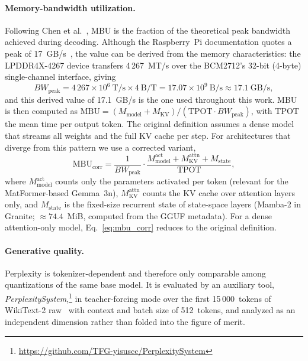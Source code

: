 \documentclass[acmsmall,natbib=false]{acmart}
\begin{document}
\paragraph{Memory-bandwidth utilization.}
Following Chen et al.~\cite{chen_inference_2025}, MBU is the fraction of the
theoretical peak bandwidth achieved during decoding. Although the
Raspberry~Pi documentation quotes a peak of
17~GB/s~\cite{BCM2712Doc}, the value can be derived from the memory
characteristics: the LPDDR4X-4267 device transfers 4\,267~MT/s over the
BCM2712's 32-bit (4-byte) single-channel interface, giving
\begin{equation}
  BW_{\mathrm{peak}} = 4\,267\times10^{6}~\mathrm{T/s} \times 4~\mathrm{B/T}
  = 17.07\times10^{9}~\mathrm{B/s} \approx 17.1~\mathrm{GB/s},
  \label{eq:bw_peak}
\end{equation}
and this derived value of 17.1~GB/s is the one used throughout this work.
MBU is then computed as
$\mathrm{MBU} = (M_{\mathrm{model}} + M_{\mathrm{KV}}) / (\mathrm{TPOT}
\cdot BW_{\mathrm{peak}})$, with TPOT the mean time per output token. The
original definition assumes a dense model that streams all weights and the
full KV cache per step. For architectures that diverge from this pattern we
use a corrected variant,
\begin{equation}
  \mathrm{MBU}_{\mathrm{corr}} = \frac{1}{BW_{\mathrm{peak}}}\cdot
  \frac{M_{\mathrm{model}}^{\mathrm{act}} + M_{\mathrm{KV}}^{\mathrm{attn}} +
  M_{\mathrm{state}}}{\mathrm{TPOT}},
  \label{eq:mbu_corr}
\end{equation}
where $M_{\mathrm{model}}^{\mathrm{act}}$ counts only the parameters
activated per token (relevant for the MatFormer-based Gemma~3n),
$M_{\mathrm{KV}}^{\mathrm{attn}}$ counts the KV cache over attention layers
only, and $M_{\mathrm{state}}$ is the fixed-size recurrent state of
state-space layers (Mamba-2 in Granite; ${\approx}74.4$~MiB, computed from
the GGUF metadata). For a dense attention-only model,
Eq.~\eqref{eq:mbu_corr} reduces to the original definition.

\paragraph{Generative quality.}
Perplexity is tokenizer-dependent and therefore only comparable among
quantizations of the same base model. It is evaluated by an auxiliary tool,
\textit{PerplexitySystem},\footnote{\url{https://github.com/TFG-yisuscc/PerplexitySystem}}
in teacher-forcing mode over the first 15\,000~tokens of WikiText-2
raw~\cite{merity2016pointer} with context and batch size of 512~tokens, and
analyzed as an independent dimension rather than folded into the figure of
merit.
\end{document}
